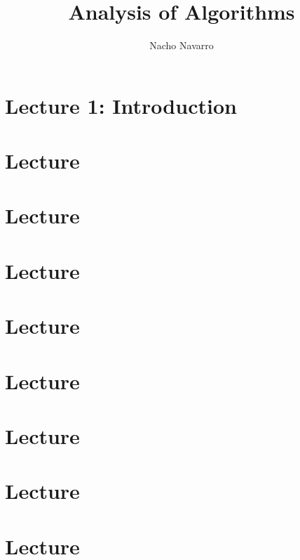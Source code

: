 \documentclass{easyclass}
\begin{document}
\begin{titlepage}
    \title{Analysis of Algorithms}
    \author{Nacho Navarro}
    \maketitle
\end{titlepage}

\tableofcontents

\chapter{Lecture 1: Introduction}


\chapter{Lecture}


\chapter{Lecture}


\chapter{Lecture}


\chapter{Lecture}


\chapter{Lecture}


\chapter{Lecture}


\chapter{Lecture}


\chapter{Lecture}



%
\end{document}
